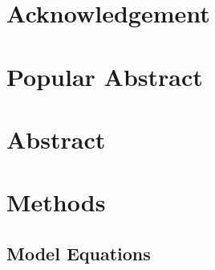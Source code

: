 \documentclass[a4paper,11pt,UKenglish,twoside,openright]{report}\usepackage[]{graphicx}\usepackage[]{color}
\begin{document}

\setcounter{page}{0}

\tableofcontents

\listoftables

\listoffigures



\doublespacing


\chapter*{Acknowledgement}
\label{Ack}




\chapter*{Popular Abstract}
\label{Ab.0}




\chapter*{Abstract}
\label{Ab.1}


\clearpage
\thispagestyle{empty}

\setcounter{page}{0} %




\chapter{Methods}
\label{chp:3}

\section{Model Equations}
\end{document}
